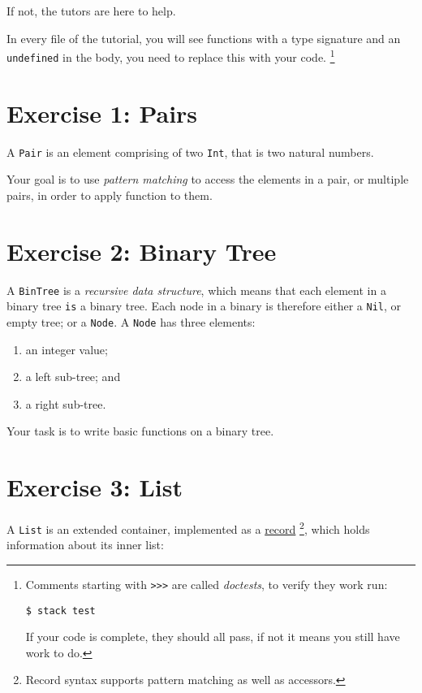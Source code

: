 \documentclass[12pt,]{tufte-handout}
\providecommand{\tightlist}{%
  \setlength{\itemsep}{0pt}\setlength{\parskip}{0pt}}
\begin{document}
If not, the tutors are here to help.

In every file of the tutorial, you will see functions with a type
signature and an \texttt{undefined} in the body, you need to replace
this with your code. \footnote{Comments starting with
  \texttt{\textgreater{}\textgreater{}\textgreater{}} are called
  \emph{doctests}, to verify they work run:

  \texttt{\$\ stack\ test}

  If your code is complete, they should all pass, if not it means you
  still have work to do.}

\section{Exercise 1: Pairs}\label{exercise-1-pairs}

A \texttt{Pair} is an element comprising of two \texttt{Int}, that is
two natural numbers.

Your goal is to use \emph{pattern matching} to access the elements in a
pair, or multiple pairs, in order to apply function to them.

\section{Exercise 2: Binary Tree}\label{exercise-2-binary-tree}

A \texttt{BinTree} is a \emph{recursive data structure}, which means
that each element in a binary tree \texttt{is} a binary tree. Each node
in a binary is therefore either a \texttt{Nil}, or empty tree; or a
\texttt{Node}. A \texttt{Node} has three elements:

\begin{enumerate}
\def\labelenumi{\arabic{enumi}.}
\tightlist
\item
  an integer value;
\item
  a left sub-tree; and
\item
  a right sub-tree.
\end{enumerate}

Your task is to write basic functions on a binary tree.

\section{Exercise 3: List}\label{exercise-3-list}

A \texttt{List} is an extended container, implemented as a
\href{https://en.wikibooks.org/wiki/Haskell/More_on_datatypes\#Named_Fields_.28Record_Syntax.29}{record}
\footnote{Record syntax supports pattern matching as well as accessors.},
which holds information about its inner list:
\end{document}
